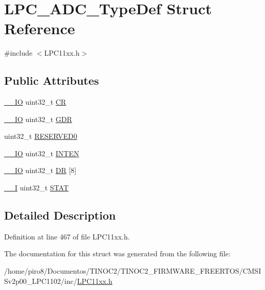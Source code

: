 \hypertarget{struct_l_p_c___a_d_c___type_def}{}\section{L\+P\+C\+\_\+\+A\+D\+C\+\_\+\+Type\+Def Struct Reference}
\label{struct_l_p_c___a_d_c___type_def}


{\ttfamily \#include $<$L\+P\+C11xx.\+h$>$}

\subsection*{Public Attributes}
\begin{DoxyCompactItemize}
\item 
\hyperlink{group___c_m_s_i_s__core__definitions_gaec43007d9998a0a0e01faede4133d6be}{\+\_\+\+\_\+\+IO} uint32\+\_\+t \hyperlink{group___l_p_c11xx___definitions_ga5d9525fbad55b4d561ec1f4c8e1a6c75}{CR}
\item 
\hyperlink{group___c_m_s_i_s__core__definitions_gaec43007d9998a0a0e01faede4133d6be}{\+\_\+\+\_\+\+IO} uint32\+\_\+t \hyperlink{group___l_p_c11xx___definitions_ga6891936fcf717753e53ffed97d6329dd}{G\+DR}
\item 
uint32\+\_\+t \hyperlink{group___l_p_c11xx___definitions_ga40cf73fb4dbf0486e17c338b59481012}{R\+E\+S\+E\+R\+V\+E\+D0}
\item 
\hyperlink{group___c_m_s_i_s__core__definitions_gaec43007d9998a0a0e01faede4133d6be}{\+\_\+\+\_\+\+IO} uint32\+\_\+t \hyperlink{group___l_p_c11xx___definitions_gafd88fd018d5d8464442e7c6bbabda5a2}{I\+N\+T\+EN}
\item 
\hyperlink{group___c_m_s_i_s__core__definitions_gaec43007d9998a0a0e01faede4133d6be}{\+\_\+\+\_\+\+IO} uint32\+\_\+t \hyperlink{group___l_p_c11xx___definitions_gacb2fe5ff342d70582f0f476c880ab2cc}{DR} \mbox{[}8\mbox{]}
\item 
\hyperlink{group___c_m_s_i_s__core__definitions_gaf63697ed9952cc71e1225efe205f6cd3}{\+\_\+\+\_\+I} uint32\+\_\+t \hyperlink{group___l_p_c11xx___definitions_ga1bdbd1fea2c9424fa59b47192fcf63d0}{S\+T\+AT}
\end{DoxyCompactItemize}


\subsection{Detailed Description}


Definition at line 467 of file L\+P\+C11xx.\+h.



The documentation for this struct was generated from the following file\+:\begin{DoxyCompactItemize}
\item 
/home/piro8/\+Documentos/\+T\+I\+N\+O\+C2/\+T\+I\+N\+O\+C2\+\_\+\+F\+I\+R\+M\+W\+A\+R\+E\+\_\+\+F\+R\+E\+E\+R\+T\+O\+S/\+C\+M\+S\+I\+Sv2p00\+\_\+\+L\+P\+C1102/inc/\hyperlink{_l_p_c11xx_8h}{L\+P\+C11xx.\+h}\end{DoxyCompactItemize}
